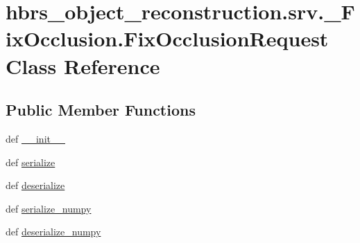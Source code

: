 \hypertarget{classhbrs__object__reconstruction_1_1srv_1_1___fix_occlusion_1_1_fix_occlusion_request}{\section{hbrs\-\_\-object\-\_\-reconstruction.\-srv.\-\_\-\-Fix\-Occlusion.\-Fix\-Occlusion\-Request \-Class \-Reference}
\label{classhbrs__object__reconstruction_1_1srv_1_1___fix_occlusion_1_1_fix_occlusion_request}
}
\subsection*{\-Public \-Member \-Functions}
\begin{DoxyCompactItemize}
\item 
def \hyperlink{classhbrs__object__reconstruction_1_1srv_1_1___fix_occlusion_1_1_fix_occlusion_request_a80c53a79b67d8cbb534a2c98dc980c7d}{\-\_\-\-\_\-init\-\_\-\-\_\-}
\item 
def \hyperlink{classhbrs__object__reconstruction_1_1srv_1_1___fix_occlusion_1_1_fix_occlusion_request_a4dd30aca99eb722e310699cd74fb6b7d}{serialize}
\item 
def \hyperlink{classhbrs__object__reconstruction_1_1srv_1_1___fix_occlusion_1_1_fix_occlusion_request_adce06576ae29c16631c9438ed9add7f7}{deserialize}
\item 
def \hyperlink{classhbrs__object__reconstruction_1_1srv_1_1___fix_occlusion_1_1_fix_occlusion_request_acb4a240519b8d3eb31906e002e66f0ba}{serialize\-\_\-numpy}
\item 
def \hyperlink{classhbrs__object__reconstruction_1_1srv_1_1___fix_occlusion_1_1_fix_occlusion_request_a27f69590f830a635bd329b7a882a0cb6}{deserialize\-\_\-numpy}
\end{DoxyCompactItemize}


